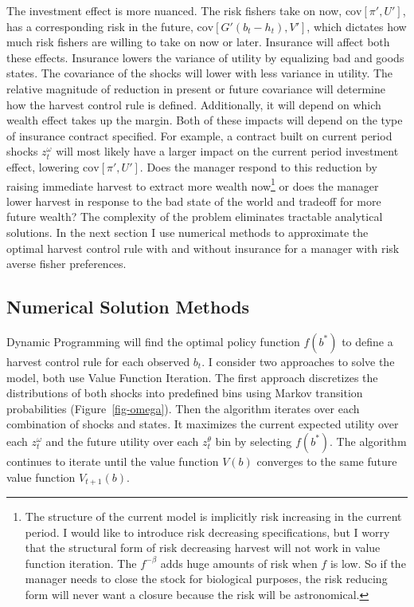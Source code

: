 \documentclass[
  letterpaper,
  DIV=11,
  numbers=noendperiod]{scrartcl}
\begin{document}
The investment effect is more nuanced. The risk fishers take on now,
\(\text{cov}[\pi',U']\), has a corresponding risk in the future,
\(\text{cov}[G'(b_t-h_t),V']\), which dictates how much risk fishers are
willing to take on now or later. Insurance will affect both these
effects. Insurance lowers the variance of utility by equalizing bad and
goods states. The covariance of the shocks will lower with less variance
in utility. The relative magnitude of reduction in present or future
covariance will determine how the harvest control rule is defined.
Additionally, it will depend on which wealth effect takes up the margin.
Both of these impacts will depend on the type of insurance contract
specified. For example, a contract built on current period shocks
\(z_t^\omega\) will most likely have a larger impact on the current
period investment effect, lowering \(\text{cov}[\pi',U']\). Does the
manager respond to this reduction by raising immediate harvest to
extract more wealth now\footnote{The structure of the current model is
  implicitly risk increasing in the current period. I would like to
  introduce risk decreasing specifications, but I worry that the
  structural form of risk decreasing harvest will not work in value
  function iteration. The \(f^{-\beta}\) adds huge amounts of risk when
  \(f\) is low. So if the manager needs to close the stock for
  biological purposes, the risk reducing form will never want a closure
  because the risk will be astronomical.} or does the manager lower
harvest in response to the bad state of the world and tradeoff for more
future wealth? The complexity of the problem eliminates tractable
analytical solutions. In the next section I use numerical methods to
approximate the optimal harvest control rule with and without insurance
for a manager with risk averse fisher preferences.

\hypertarget{numerical-solution-methods}{%
\subsection{Numerical Solution
Methods}\label{numerical-solution-methods}}

Dynamic Programming will find the optimal policy function \(f(b^*)\) to
define a harvest control rule for each observed \(b_t\). I consider two
approaches to solve the model, both use Value Function Iteration. The
first approach discretizes the distributions of both shocks into
predefined bins using Markov transition probabilities
(Figure~\ref{fig-omega}). Then the algorithm iterates over each
combination of shocks and states. It maximizes the current expected
utility over each \(z_t^\omega\) and the future utility over each
\(z_t^\theta\) bin by selecting \(f(b^*)\). The algorithm continues to
iterate until the value function \(V(b)\) converges to the same future
value function \(V_{t+1}(b)\).
\end{document}
